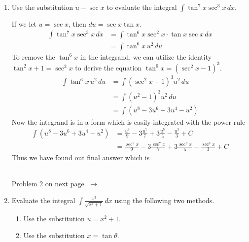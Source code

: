 \documentclass{article}
\begin{document}
\begin{enumerate}[label=\textbf{(5.\arabic*)}]


\item Use the substitution $u-\sec x$ to evaluate the integral $\displaystyle{\int\!\tan^7x\sec^3x\, dx}$.

If we let $u=\sec x$, then $du=\sec x\tan x$.
\begin{align*}
    \int\!\tan^7x\sec^3x\, dx &= \int\!\tan^6x\sec^2x\cdot\tan x\sec x\, dx \\
    &=\int\!\tan^6x \,u^2\, du
\end{align*}
To remove the $\tan^6x$ in the integrand, we can utilize the identity $\tan^2x+1=\sec^2x$ to derive the equation $\tan^6x=\left(\sec^2x-1\right)^3$.
\begin{align*}
    \int\!\tan^6x \,u^2\, du &= \int\!\left(\sec^2x-1\right)^3u^2\, du \\ 
    &= \int\!\left(u^2-1\right)^3u^2\,du \\
    &= \int\!\left(u^8-3u^6+3u^4-u^2\right)
\end{align*}
Now the integrand is in a form which is easily integrated with the power rule
\begin{align*}
    \int\!\left(u^8-3u^6+3u^4-u^2\right) &= \frac{u^9}{9}-3\frac{u^7}{7}+3\frac{u^5}{5}-\frac{u^3}{3}+C \\
    &= \frac{\sec^9x}{9}-3\frac{\sec^7x}{7}+3\frac{\sec^5x}{5}-\frac{\sec^3x}{3}+C
\end{align*}
Thus we have found out final answer which is
\begin{center}
 \\
\vspace{1 in}
Problem 2 on next page. $\rightarrow$
\end{center}


\newpage 


\item Evaluate the integral $\displaystyle{\int\!\frac{x^3}{\sqrt{x^2+1}}\,dx}$ using the following two methods.
\begin{enumerate}
    \item Use the substitution $u=x^2+1$.
    \item Use the substitution $x=\tan\theta$.
\end{enumerate}


\end{enumerate}
\end{document}
